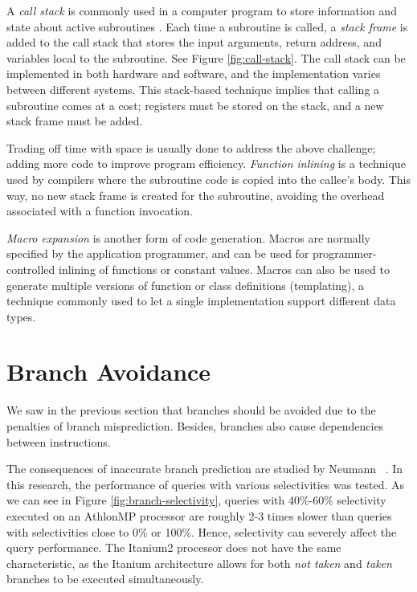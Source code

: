 A \textit{call stack} is commonly used in a computer program to store information and state about active subroutines \cite{Wikipedia_contributors2015-od}. Each time a subroutine is called, a \textit{stack frame} is added to the call stack that stores the input arguments, return address, and variables local to the subroutine. See Figure \ref{fig:call-stack}. The call stack can be implemented in both hardware and software, and the implementation varies between different systems. This stack-based technique implies that calling a subroutine comes at a cost; registers must be stored on the stack, and a new stack frame must be added.

Trading off time with space is usually done to address the above challenge; adding more code to improve program efficiency. \textit{Function inlining} is a technique used by compilers where the subroutine code is copied into the callee's body. This way, no new stack frame is created for the subroutine, avoiding the overhead associated with a function invocation.

\textit{Macro expansion} is another form of code generation. Macros are normally specified by the application programmer, and can be used for programmer-controlled inlining of functions or constant values. Macros can also be used to generate multiple versions of function or class definitions (templating), a technique commonly used to let a single implementation support different data types.

\section{Branch Avoidance}
\label{sec:Branch Avoidance}

We saw in the previous section that branches should be avoided due to the penalties of branch misprediction. Besides, branches also cause dependencies between instructions. 

The consequences of inaccurate branch prediction are studied by Neumann \ea~\cite{Neumann2011-uq}. In this research, the performance of queries with various selectivities was tested. As we can see in Figure \ref{fig:branch-selectivity}, queries with 40\%-60\% selectivity executed on an AthlonMP processor are roughly 2-3 times slower than queries with selectivities close to 0\% or 100\%. Hence, selectivity can severely affect the query performance. The Itanium2 processor does not have the same characteristic, as the Itanium architecture allows for both \textit{not taken} and \textit{taken} branches to be executed simultaneously.

